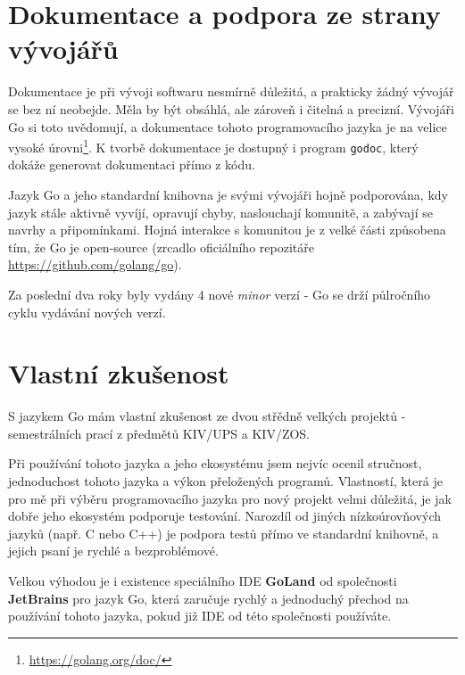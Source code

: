 \documentclass[12pt, a4paper]{article}
\let\oldsection\section
\renewcommand\section{\clearpage\oldsection}
\begin{document}
\section{Dokumentace a podpora ze strany vývojářů}

Dokumentace je při vývoji softwaru nesmírně důležitá, a prakticky žádný vývojář se bez ní neobejde. Měla by být obsáhlá, ale zároveň i čitelná a precizní. Vývojáři Go si toto uvědomují, a dokumentace tohoto programovacího jazyka je na velice vysoké úrovni\footnote{\url{https://golang.org/doc/}}. K tvorbě dokumentace je dostupný i program \texttt{godoc}, který dokáže generovat dokumentaci přímo z kódu.

Jazyk Go a jeho standardní knihovna je svými vývojáři hojně podporována, kdy jazyk stále aktivně vyvíjí, opravují chyby, naslouchají komunitě, a zabývají se navrhy a připomínkami. Hojná interakce s komunitou je z velké části způsobena tím, že Go je open-source (zrcadlo oficiálního repozitáře \url{https://github.com/golang/go}). 

Za poslední dva roky byly vydány 4 nové \textit{minor} verzí - Go se drží půlročního cyklu vydávání nových verzí.

\section{}

\section{Vlastní zkušenost}

S jazykem Go mám vlastní zkušenost ze dvou střědně velkých projektů - semestrálních prací z předmětů KIV/UPS a KIV/ZOS.

Při používání tohoto jazyka a jeho ekosystému jsem nejvíc ocenil stručnost, jednoduchost tohoto jazyka a výkon přeložených programů. Vlastností, která je pro mě při výběru programovacího jazyka pro nový projekt velmi důležitá, je jak dobře jeho ekosystém podporuje testování. Narozdíl od jiných nízkoúrovňových jazyků (např. C nebo C++) je podpora testů přímo ve standardní knihovně, a jejich psaní je rychlé a bezproblémové.

Velkou výhodou je i existence speciálního IDE \textbf{GoLand} od společnosti \textbf{JetBrains} pro jazyk Go, která zaručuje rychlý a jednoduchý přechod na používání tohoto
jazyka, pokud již IDE od této společnosti používáte.
\end{document}
